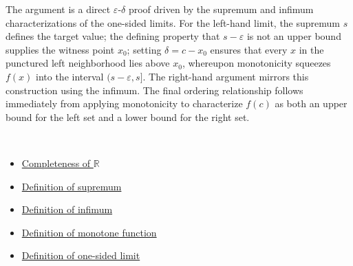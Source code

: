 \begin{remark*}
The argument is a direct $\varepsilon$-$\delta$ proof driven by the supremum and infimum characterizations of the one-sided limits. For the left-hand limit, the supremum $s$ defines the target value; the defining property that $s - \varepsilon$ is not an upper bound supplies the witness point $x_0$; setting $\delta = c - x_0$ ensures that every $x$ in the punctured left neighborhood lies above $x_0$, whereupon monotonicity squeezes $f(x)$ into the interval $(s - \varepsilon, s]$. The right-hand argument mirrors this construction using the infimum. The final ordering relationship follows immediately from applying monotonicity to characterize $f(c)$ as both an upper bound for the left set and a lower bound for the right set.
\end{remark*}

\begin{remark*}[Dependencies]~\\
\begin{itemize}
  \item \hyperref[ax:completeness]{Completeness of $\mathbb{R}$}
  \item \hyperref[def:supremum]{Definition of supremum}
  \item \hyperref[def:infimum]{Definition of infimum}
  \item \hyperref[def:monotone-function]{Definition of monotone function}
  \item \hyperref[def:one-sided-limit]{Definition of one-sided limit}
\end{itemize}
\end{remark*}

\clearpage
